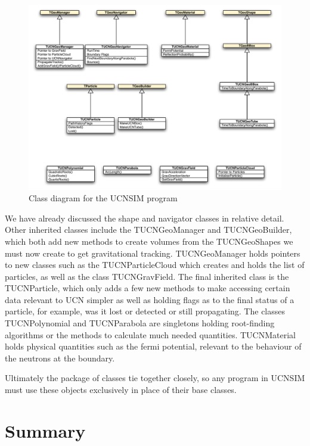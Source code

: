 \documentclass[11pt,a4paper,oneside]{article}
\begin{document}
\begin{figure}[!htbp] 
\begin{center}
\includegraphics[scale=0.7]{designdocumentimages/UCNSIMClassStructure}
\end{center}
\caption{Class diagram for the UCNSIM program}
\label{fig:UCNSIMClassStructure}
\end{figure}

We have already discussed the shape and navigator classes in relative detail. Other inherited classes include the TUCNGeoManager and TUCNGeoBuilder, which both add new methods to create volumes from the TUCNGeoShapes we must now create to get gravitational tracking. TUCNGeoManager holds pointers to new classes such as the TUCNParticleCloud which creates and holds the list of particles, as well as the class TUCNGravField. The final inherited class is the TUCNParticle, which only adds a few new methods to make accessing certain data relevant to UCN simpler as well as holding flags as to the final status of a particle, for example, was it lost or detected or still propagating. The classes TUCNPolynomial and TUCNParabola are singletons holding root-finding algorithms or the methods to calculate much needed quantities. TUCNMaterial holds physical quantities such as the fermi potential, relevant to the behaviour of the neutrons at the boundary.

Ultimately the package of classes tie together closely, so any program in UCNSIM must use these objects exclusively in place of their base classes. 


\section{Summary}
\end{document}
